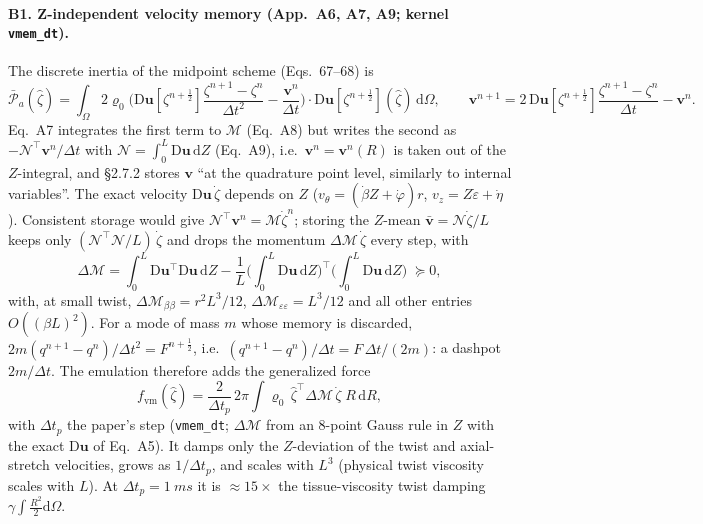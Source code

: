 \documentclass[10pt]{article}
\begin{document}
\paragraph{B1. Z-independent velocity memory (App.~A6, A7, A9; kernel \texttt{vmem\_dt}).}
The discrete inertia of the midpoint scheme (Eqs.~67--68) is
\begin{equation*}
\bar{\mathcal P}_a(\hat\zeta)=\int_\Omega2\varrho_0\Big(\mathrm D\boldsymbol u[\zeta^{n+\frac12}]\frac{\zeta^{n+1}-\zeta^n}{\Delta t^2}-\frac{\boldsymbol v^n}{\Delta t}\Big)\cdot\mathrm D\boldsymbol u[\zeta^{n+\frac12}](\hat\zeta)\,\mathrm d\Omega,
\qquad
\boldsymbol v^{n+1}=2\,\mathrm D\boldsymbol u[\zeta^{n+\frac12}]\frac{\zeta^{n+1}-\zeta^n}{\Delta t}-\boldsymbol v^n .
\end{equation*}
Eq.~A7 integrates the first term to $\mathcal M$ (Eq.~A8) but writes the second as
$-\mathcal N^\top\boldsymbol v^n/\Delta t$ with $\mathcal N=\int_0^L\mathrm D\boldsymbol u\,\mathrm dZ$
(Eq.~A9), i.e.\ $\boldsymbol v^n=\boldsymbol v^n(R)$ is taken out of the $Z$-integral, and \S2.7.2
stores $\boldsymbol v$ ``at the quadrature point level, similarly to internal variables''. The
exact velocity $\mathrm D\boldsymbol u\,\dot\zeta$ depends on $Z$
($v_\theta=(\dot\beta Z+\dot\varphi)r$, $v_z=Z\dot\varepsilon+\dot\eta$). Consistent storage would
give $\mathcal N^\top\boldsymbol v^n=\mathcal M\dot\zeta^n$; storing the $Z$-mean
$\bar{\boldsymbol v}=\mathcal N\dot\zeta/L$ keeps only $(\mathcal N^\top\mathcal N/L)\,\dot\zeta$
and drops the momentum $\Delta\mathcal M\,\dot\zeta$ every step, with
\begin{equation*}
\Delta\mathcal M=\int_0^L\mathrm D\boldsymbol u^\top\mathrm D\boldsymbol u\,\mathrm dZ
-\frac1L\Big(\int_0^L\mathrm D\boldsymbol u\,\mathrm dZ\Big)^{\!\top}\Big(\int_0^L\mathrm D\boldsymbol u\,\mathrm dZ\Big)\;\succeq0,
\end{equation*}
with, at small twist, $\Delta\mathcal M_{\beta\beta}=r^2L^3/12$,
$\Delta\mathcal M_{\varepsilon\varepsilon}=L^3/12$ and all other entries $O((\beta L)^2)$.
For a mode of mass $m$ whose memory is discarded,
$2m(q^{n+1}-q^n)/\Delta t^2=F^{n+\frac12}$, i.e.\ $(q^{n+1}-q^n)/\Delta t=F\,\Delta t/(2m)$: a
dashpot $2m/\Delta t$. The emulation therefore adds the generalized force
\begin{equation*}
f_\text{vm}(\hat\zeta)=\frac{2}{\Delta t_p}\,2\pi\!\int\varrho_0\,\hat\zeta^\top\Delta\mathcal M\,\dot\zeta\;R\,\mathrm dR ,
\end{equation*}
with $\Delta t_p$ the paper's step (\texttt{vmem\_dt}; $\Delta\mathcal M$ from an 8-point Gauss rule
in $Z$ with the exact $\mathrm D\boldsymbol u$ of Eq.~A5). It damps only the $Z$-deviation of the
twist and axial-stretch velocities, grows as $1/\Delta t_p$, and scales with $L^3$ (physical
twist viscosity scales with $L$). At $\Delta t_p=\SI{1}{ms}$ it is $\approx15\times$ the
tissue-viscosity twist damping $\gamma\int\tfrac{R^2}{2}\mathrm d\Omega$.
\end{document}
